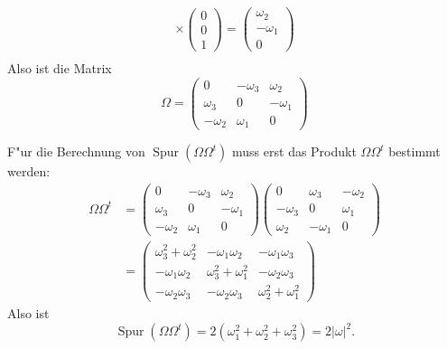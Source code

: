 \begin{loesung}
\begin{teilaufgaben}
\begin{align*}
\times
\begin{pmatrix}0\\0\\1\end{pmatrix}
=
\begin{pmatrix}\omega_2\\-\omega_1\\0\end{pmatrix}
\\
\end{align*}
Also ist die Matrix
\[
\Omega=\begin{pmatrix}
0&-\omega_3&\omega_2\\
\omega_3&0&-\omega_1\\
-\omega_2&\omega_1&0
\end{pmatrix}
\]
\item
F"ur die Berechnung von $\operatorname{Spur}(\Omega\Omega^t)$ muss erst
das Produkt $\Omega\Omega^t$ bestimmt werden:
\begin{align*}
\Omega\Omega^t
&=
\begin{pmatrix}
0&-\omega_3&\omega_2\\
\omega_3&0&-\omega_1\\
-\omega_2&\omega_1&0
\end{pmatrix}
\begin{pmatrix}
0&\omega_3&-\omega_2\\
-\omega_3&0&\omega_1\\
\omega_2&-\omega_1&0
\end{pmatrix}
\\
&=
\begin{pmatrix}
\omega_3^2+\omega_2^2&-\omega_1\omega_2&-\omega_1\omega_3\\
-\omega_1\omega_2&\omega_3^2+\omega_1^2&-\omega_2\omega_3\\
-\omega_2\omega_3&-\omega_2\omega_3&\omega_2^2+\omega_1^2
\end{pmatrix}
\end{align*}
Also ist
\[
\operatorname{Spur}(\Omega\Omega^t)=2(\omega_1^2+\omega_2^2+\omega_3^2)=2|\omega|^2.
\]
\end{teilaufgaben}
\end{loesung}

